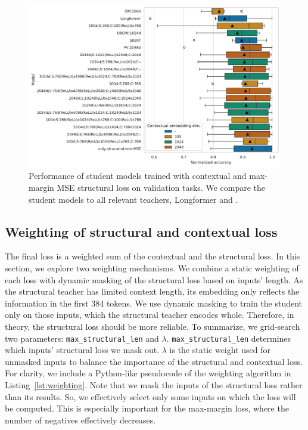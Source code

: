 \begin{figure}

  \includegraphics[width=\textwidth]{img/projections_contextual_mm_mse.pdf}

  \caption{Performance of student models trained with contextual and
  max-margin MSE structural loss on validation tasks. We compare the student
  models to all relevant teachers, Longformer and
  .}

  \label{fig:mm_mse_contextual_projections}

\end{figure}

\subsection{Weighting of structural and contextual
loss}\label{section:weighting_experiments}

The final loss is a weighted sum of the contextual and the structural loss. In
this section, we explore two weighting mechanisms. We combine a static
weighting of each loss with dynamic masking of the structural loss based on
inputs' length. As the structural teacher has limited context length, its
embedding only reflects the information in the first 384 tokens. We use dynamic
masking to train the student only on those inputs, which the structural teacher
encodes whole. Therefore, in theory, the structural loss should be more
reliable. To summarize, we grid-search two parameters:
\texttt{max\_structural\_len} and $\lambda$. \texttt{max\_structural\_len}
determines which inputs' structural loss we mask out. $\lambda$ is the static
weight used for unmasked inputs to balance the importance of the structural and
contextual loss. For clarity, we include a Python-like pseudocode of the
weighting algorithm in Listing~\ref{lst:weighting}. Note that we mask the
inputs of the structural loss rather than its results. So, we effectively
select only some inputs on which the loss will be computed. This is especially
important for the max-margin loss, where the number of negatives effectively
decreases.

